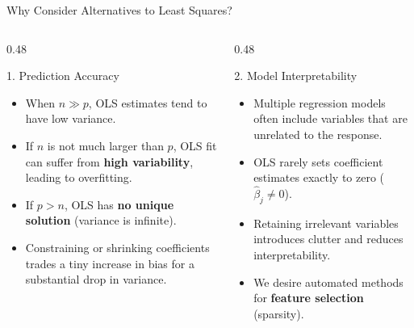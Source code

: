 \documentclass[aspectratio=169, 11pt]{beamer}
\begin{document}
\begin{frame}{Why Consider Alternatives to Least Squares?}
    \begin{columns}[T]
        \begin{column}{0.48\textwidth}
            \begin{block}{1. Prediction Accuracy}
                \begin{itemize}
                    \item When $n \gg p$, OLS estimates tend to have low variance.
                    \item If $n$ is not much larger than $p$, OLS fit can suffer from \textbf{high variability}, leading to overfitting.
                    \item If $p > n$, OLS has \textbf{no unique solution} (variance is infinite).
                    \item Constraining or shrinking coefficients trades a tiny increase in bias for a substantial drop in variance.
                \end{itemize}
            \end{block}
        \end{column}

        \begin{column}{0.48\textwidth}
            \begin{block}{2. Model Interpretability}
                \begin{itemize}
                    \item Multiple regression models often include variables that are unrelated to the response.
                    \item OLS rarely sets coefficient estimates exactly to zero ($\hat{\beta}_j \neq 0$).
                    \item Retaining irrelevant variables introduces clutter and reduces interpretability.
                    \item We desire automated methods for \textbf{feature selection} (sparsity).
                \end{itemize}
            \end{block}
        \end{column}
    \end{columns}
\end{frame}
\end{document}
